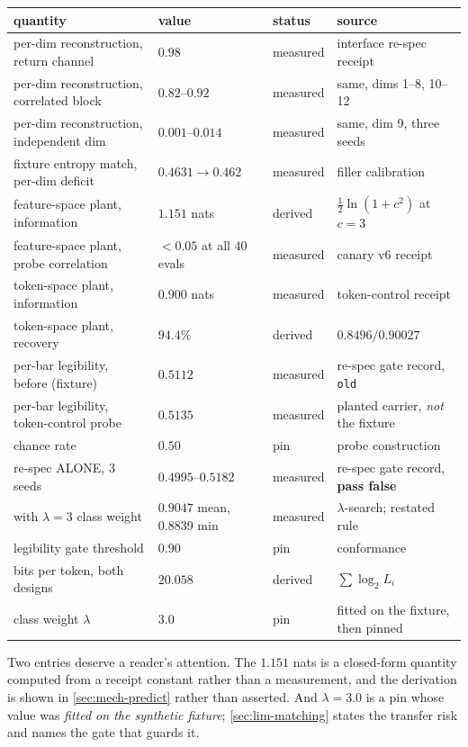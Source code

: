 \begin{center}
\small
\begin{tabularx}{\linewidth}{lllX}
\toprule
quantity & value & status & source \\
\midrule
per-dim reconstruction, return channel & $0.98$ & measured & interface re-spec receipt \\
per-dim reconstruction, correlated block & $0.82$--$0.92$ & measured & same, dims 1--8, 10--12 \\
per-dim reconstruction, independent dim & $0.001$--$0.014$ & measured & same, dim 9, three seeds \\
fixture entropy match, per-dim deficit & $0.4631 \to 0.462$ & measured & filler calibration \\
feature-space plant, information & $1.151$ nats & derived & $\tfrac12\ln(1+c^2)$ at $c=3$ \\
feature-space plant, probe correlation & $< 0.05$ at all $40$ evals & measured & canary v6 receipt \\
token-space plant, information & $0.900$ nats & measured & token-control receipt \\
token-space plant, recovery & $94.4\%$ & derived & $0.8496 / 0.90027$ \\
per-bar legibility, before (fixture) & $0.5112$ & measured & re-spec gate record, \texttt{old} \\
per-bar legibility, token-control probe & $0.5135$ & measured & planted carrier, \emph{not} the fixture \\
chance rate & $0.50$ & pin & probe construction \\
re-spec ALONE, 3 seeds & $0.4995$--$0.5182$ & measured & re-spec gate record, \textbf{pass false} \\
with $\lambda=3$ class weight & $0.9047$ mean, $0.8839$ min & measured & $\lambda$-search; restated rule \\
legibility gate threshold & $0.90$ & pin & conformance \\
bits per token, both designs & $20.058$ & derived & $\sum \log_2 L_i$ \\
class weight $\lambda$ & $3.0$ & pin & fitted on the fixture, then pinned \\
\bottomrule
\end{tabularx}
\end{center}

Two entries deserve a reader's attention. The $1.151$ nats is a closed-form quantity computed from
a receipt constant rather than a measurement, and the derivation is shown in \cref{sec:mech-predict}
rather than asserted. And $\lambda = 3.0$ is a pin whose value was \emph{fitted on the synthetic
fixture}; \cref{sec:lim-matching} states the transfer risk and names the gate that guards it.


